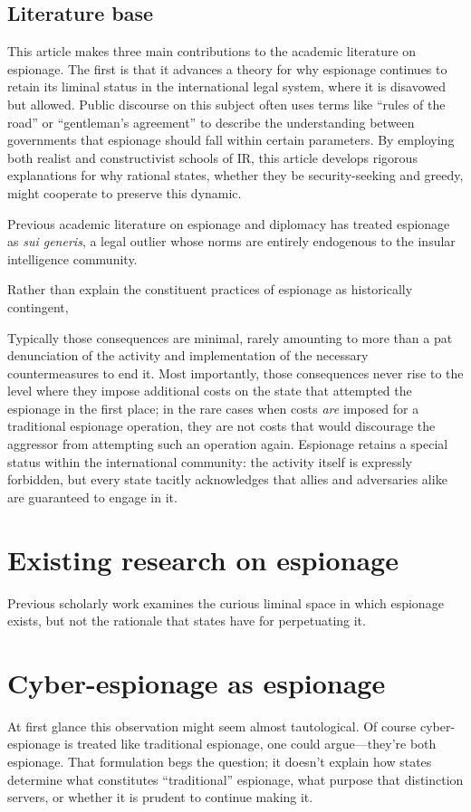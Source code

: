 \documentclass[14pt]{extarticle}
\begin{document}
\subsection{Literature base}
This article makes three main contributions to the academic literature on espionage. The first is that it advances a theory for why espionage continues to retain its liminal status in the international legal system, where it is disavowed but allowed. Public discourse on this subject often uses terms like \enquote{rules of the road} or \enquote{gentleman's agreement} to describe the understanding between governments that espionage should fall within certain parameters. By employing both realist and constructivist schools of IR, this article develops rigorous explanations for why rational states, whether they be security-seeking and greedy, might cooperate to preserve this dynamic.



Previous academic literature on espionage and diplomacy has treated espionage as \emph{sui generis}, a legal outlier whose norms are entirely endogenous to the insular intelligence community.



Rather than explain the constituent practices of espionage as historically contingent,


Typically those consequences are minimal, rarely amounting to more than a pat denunciation of the activity and implementation of the necessary countermeasures to end it. Most importantly, those consequences never rise to the level where they impose additional costs on the state that attempted the espionage in the first place; in the rare cases when costs \emph{are} imposed for a traditional espionage operation, they are not costs that would discourage the aggressor from attempting such an operation again. Espionage retains a special status within the international community: the activity itself is expressly forbidden, but every state tacitly acknowledges that allies and adversaries alike are guaranteed to engage in it.


\section{Existing research on espionage}
Previous scholarly work examines the curious liminal space in which espionage exists, but not the rationale that states have for perpetuating it.


\section{Cyber-espionage as espionage}
At first glance this observation might seem almost tautological. Of course cyber-espionage is treated like traditional espionage, one could argue---they're both espionage. That formulation begs the question; it doesn't explain how states determine what constitutes \enquote{traditional} espionage, what purpose that distinction servers, or whether it is prudent to continue making it.
\end{document}
